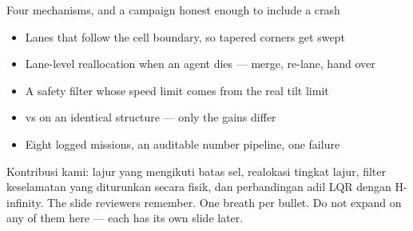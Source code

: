 \documentclass[aspectratio=169,11pt,t]{beamer}
\renewcommand{\sectioncount}{9}
\begin{document}
\begin{frame}{Four mechanisms, and a campaign honest enough to include a crash}
  \begin{itemize}\bulletgap
    \item Lanes that follow the cell boundary, so tapered corners get swept
    \item Lane-level reallocation when an agent dies --- merge, re-lane, hand over
    \item A safety filter whose speed limit comes from the real tilt limit
    \item \lqr{} vs \hinf{} on an identical structure --- only the gains differ
    \item Eight logged missions, an auditable number pipeline, one failure
  \end{itemize}
    {Kontribusi kami: lajur yang mengikuti batas sel, realokasi tingkat lajur, filter keselamatan yang diturunkan secara fisik, dan perbandingan adil LQR dengan H-infinity.}
    {The slide reviewers remember. One breath per bullet. Do not expand
        on any of them here --- each has its own slide later.}
\end{frame}

\kick{System}{2 / \sectioncount}
\end{document}
